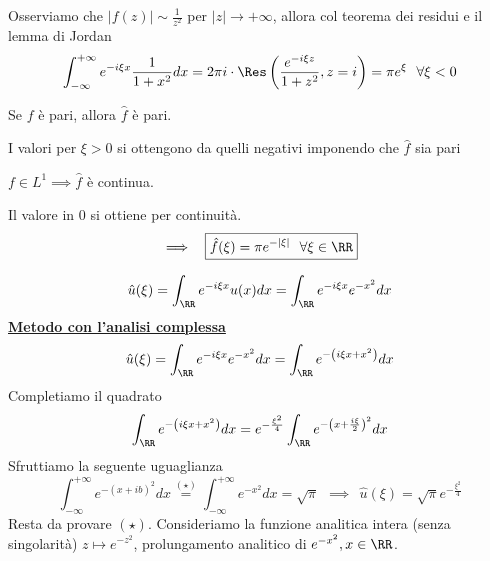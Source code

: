 Osserviamo che $| f(z)| \sim \frac{1}{z^{2}}$ per $| z| \rightarrow + \infty $, allora col teorema dei residui e il lemma di Jordan
\begin{equation*}
\int^{+ \infty}_{- \infty} e^{- i\xi x}\frac{1}{1 + x^{2}} dx = 2\pi i \cdot \Res \left(\frac{e^{- i\xi z}}{1 + z^{2}}, z = i\right) = \pi e^{\xi} \ \ \forall \xi < 0
\end{equation*}
\begin{rem}
Se $f$ è pari, allora $\hat{f}$ è pari.
\end{rem}
I valori per $\xi > 0$ si ottengono da quelli negativi imponendo che $\hat{f}$ sia pari
\begin{rem}
$f\in L^{1} \implies \hat{f}$ è continua.
\end{rem}
Il valore in $0$ si ottiene per continuità.
\begin{equation*}
\implies \ \ \boxed{\hat{f}(\xi) = \pi e^{- | \xi |} \ \ \forall \xi \in \RR}
\end{equation*}

\Soluzione

\begin{equation*}
\hat{u}(\xi) = \int_{\RR} e^{- i\xi x} u(x) dx = \int_{\RR} e^{- i\xi x} e^{- x^{2}} dx
\end{equation*}
\textbf{\underline{Metodo con l'analisi complessa}}
\begin{equation*}
\hat{u}(\xi) = \int_{\RR} e^{- i\xi x} e^{- x^{2}} dx = \int_{\RR} e^{- \left(i\xi x + x^{2}\right)} dx
\end{equation*}
Completiamo il quadrato
\begin{equation*}
\int_{\RR} e^{- \left(i\xi x + x^{2}\right)} dx = e^{- \frac{\xi^{2}}{4}}\int_{\RR} e^{- \left(x + \frac{i\xi}{2}\right)^{2}} dx
\end{equation*}
Sfruttiamo la seguente uguaglianza
\begin{equation*}
\int^{+ \infty}_{- \infty} e^{- (x + ib)^{2}} dx\overset{(\star)}{=}\int^{+ \infty}_{- \infty} e^{- x^{2}} dx = \sqrt{\pi} \ \ \implies \ \ \boxed{\hat{u}(\xi) = \sqrt{\pi} e^{- \frac{\xi^{2}}{4}}}
\end{equation*}
Resta da provare $(\star)$. Consideriamo la funzione analitica intera (senza singolarità) $z\mapsto e^{- z^{2}}$, prolungamento analitico di $e^{- x^{2}}, x\in \RR $.


